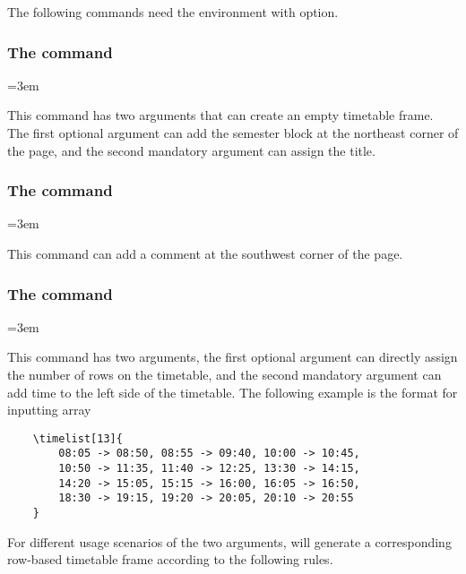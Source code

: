 \documentclass[letterpaper]{l3doc}
\newenvironment{example}{\begin{list}{}{\leftmargin=3em}\item }{\end{list}}
\begin{document}
The following commands need the  environment with  option.

\subsubsection{The  command}

\begin{example}
\end{example}

This command has two arguments that can create an empty timetable frame. The first optional argument can add the semester block at the northeast corner of the page, and the second mandatory argument can assign the title.

\subsubsection{The  command}

\begin{example}
\end{example}

This command can add a comment at the southwest corner of the page.

\subsubsection{The  command}

\begin{example}
\end{example}

This command has two arguments, the first optional argument  can directly assign the number of rows on the timetable, and the second mandatory argument  can add time to the left side of the timetable. The following example is the format for inputting array

\begin{Verbatim}
    \timelist[13]{
        08:05 -> 08:50, 08:55 -> 09:40, 10:00 -> 10:45,
        10:50 -> 11:35, 11:40 -> 12:25, 13:30 -> 14:15,
        14:20 -> 15:05, 15:15 -> 16:00, 16:05 -> 16:50,
        18:30 -> 19:15, 19:20 -> 20:05, 20:10 -> 20:55
    }
\end{Verbatim}

For different usage scenarios of the two arguments,  will generate a corresponding row-based timetable frame according to the following rules.
\end{document}
